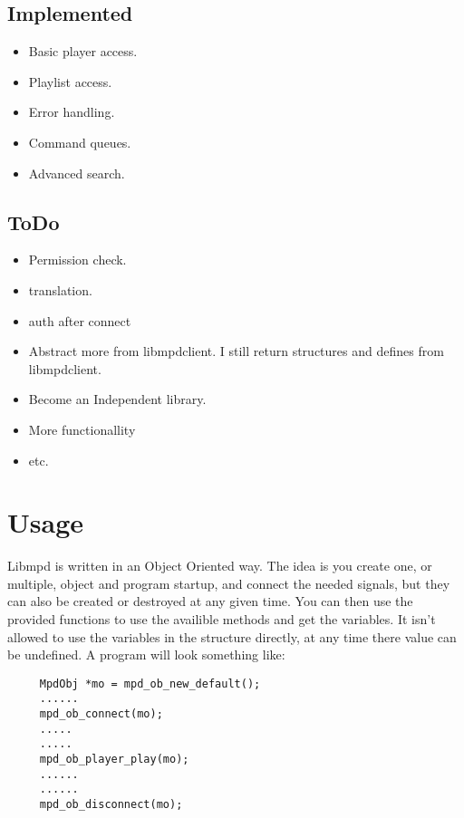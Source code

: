 \documentclass[a4paper,11pt]{article}
\begin{document}
	\subsection{Implemented}
	
	\begin{itemize}
	  \item Basic player access.
	  
	  \item Playlist access.
	  
	  \item Error handling.
	  
	  \item Command queues.
	  
	  \item Advanced search.
	\end{itemize}
	
	\subsection{ToDo}
	\begin{itemize}
	  \item Permission check.
	  
	  \item translation.
	  
	  \item auth after connect
	  
	  \item Abstract more from libmpdclient. I still return structures and defines
	  from libmpdclient.
	  
	  \item Become an Independent  library.
	  
	  \item More functionallity
	  
	  \item etc.
	\end{itemize}
	
	\section{Usage}
	Libmpd is written in an Object Oriented way. The idea is you create one, or multiple, object and program startup, and connect the needed signals, but they can also be created or destroyed at any given time. 
	You can then use the provided functions to use the availible methods and get the variables. It isn't allowed to use the variables in the structure directly, at any time there value can be undefined.
	A program will look something like:
	\begin{verbatim}
	 MpdObj *mo = mpd_ob_new_default();
	 ......
	 mpd_ob_connect(mo);
	 .....
	 .....
	 mpd_ob_player_play(mo);
	 ......
	 ......
	 mpd_ob_disconnect(mo);
	\end{verbatim}
	
\end{document}
